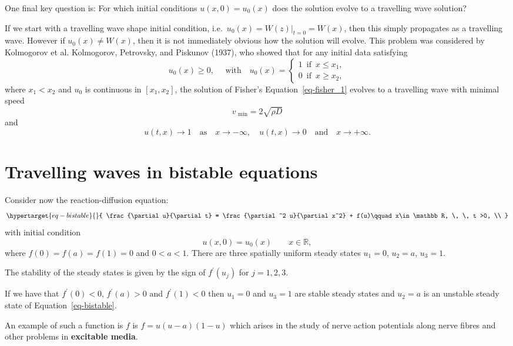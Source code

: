 \documentclass[
  letterpaper,
  DIV=11,
  numbers=noendperiod]{scrreprt}
\theoremstyle{plain}
\theoremstyle{definition}
\theoremstyle{plain}
\theoremstyle{remark}
\begin{document}
One final key question is: For which initial conditions
\(u(x,0) = u_0(x)\) does the solution evolve to a travelling wave
solution?

If we start with a travelling wave shape initial condition,
i.e.~\(u_0(x)= W(z)|_{t=0} = W(x)\), then this simply propagates as a
travelling wave. However if \(u_0(x)\neq W(x)\), then it is not
immediately obvious how the solution will evolve. This problem was
considered by Kolmogorov et al. Kolmogorov, Petrovsky, and Piskunov
(1937), who showed that for any initial data satisfying \[
 u_0(x) \geq 0, \quad \text{ with} \quad  u_0(x) = \begin{cases} 1 \, \text{ if } \, x \leq x_1, \\
 0 \, \text{ if } \, x \geq x_2, 
 \end{cases}
 \] where \(x_1 < x_2\) and \(u_0\) is continuous in \([x_1, x_2]\), the
solution of Fisher's Equation~\ref{eq-fisher_1} evolves to a travelling
wave with minimal speed \[
 v_\text{ min} = 2 \sqrt{ \rho D}
\] and \[
u(t,x) \rightarrow 1 \quad \textrm{as} \quad x\rightarrow -\infty, \quad u(t,x) \rightarrow 0 \quad \textrm{and} \quad  x\rightarrow +\infty.
\]

\hypertarget{travelling-waves-in-bistable-equations}{%
\section{Travelling waves in bistable
equations}\label{travelling-waves-in-bistable-equations}}

Consider now the reaction-diffusion equation:
\begin{equation}\protect\hypertarget{eq-bistable}{}{
 \frac{\partial u}{\partial t} = \frac{\partial^2 u}{\partial x^2} +   f(u)\qquad x\in \mathbb R, \, \, t >0,  \\
}\label{eq-bistable}\end{equation} with initial condition \[
u(x,0)=u_0(x)  \qquad x\in \mathbb R,
\] where \(f(0) = f(a) = f(1)= 0\) and \(0 < a<1\). There are three
spatially uniform steady states \(u_1 =0\), \(u_2 =a\), \(u_3=1\).

The stability of the steady states is given by the sign of
\(f^\prime(u_j)\) for \(j =1,2,3\).

If we have that \(f^\prime (0) < 0\), \(f^\prime(a) >0\) and
\(f^\prime(1) <0\) then \(u_1=0\) and \(u_3=1\) are stable steady states
and \(u_2 =a\) is an unstable steady state of
Equation~\ref{eq-bistable}.

An example of such a function is \(f\) is \(f=u(u-a)(1-u)\) which arises
in the study of nerve action potentials along nerve fibres and other
problems in \textbf{excitable media}.
\end{document}

